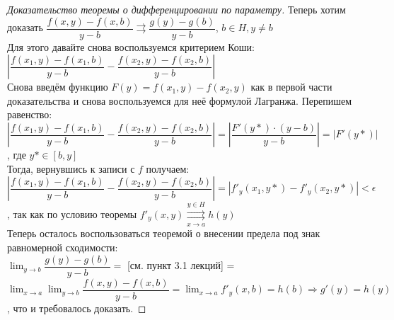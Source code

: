 \begin{proof}[Доказательство теоремы о дифференцировании по параметру]
    Теперь хотим доказать $\dfrac{f(x, y) - f(x, b)}{y - b} \rightrightarrows 
    \dfrac{g(y) - g(b)}{y - b}$, $b \in H, y \neq b$ \\
    Для этого давайте снова воспользуемся критерием Коши: \\
    $|\dfrac{f(x_1, y) - f(x_1, b)}{y - b} - \dfrac{f(x_2, y) - f(x_2, b)}{y - b}|$ \\
    Снова введём функцию $F(y) = f(x_1, y) - f(x_2, y)$ как в первой части доказательства и снова воспользуемся для 
    неё формулой Лагранжа. Перепишем равенство: \\
    $|\dfrac{f(x_1, y) - f(x_1, b)}{y - b} - \dfrac{f(x_2, y) - f(x_2, b)}{y - b}| =
    |\dfrac{F'(y*) \cdot (y - b)}{y - b}| = |F'(y*)| $, где $y* \in [b, y]$ \\
    Тогда, вернувшись к записи с $f$ получаем: \\
    $|\dfrac{f(x_1, y) - f(x_1, b)}{y - b} - \dfrac{f(x_2, y) - f(x_2, b)}{y - b}| =
    |f'_y(x_1, y*) - f'_y(x_2, y*)| < \epsilon$, так как по условию теоремы
    $f'_y(x, y) \overset{y \in H}{\underset{x \to a}{\rightrightarrows}} h(y)$ \\
    
    Теперь осталось воспользоваться теоремой о внесении предела под знак равномерной сходимости: \\
    $\lim_{y \to b} \dfrac{g(y) - g(b)}{y - b} =$ [см. пункт 3.1 лекций] = 
    $\lim_{x \to a} \lim_{y \to b} \dfrac{f(x, y) - f(x, b)}{y - b} = 
    \lim_{x \to a} f'_y(x, b) = h(b) \Rightarrow g'(y) = h(y)$, что и требовалось доказать.
\end{proof}
